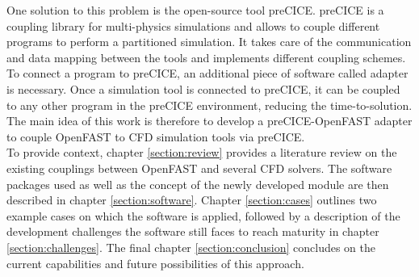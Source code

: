 One solution to this problem is the open-source tool preCICE. preCICE is a coupling library for multi-physics simulations and allows to couple different programs to perform a partitioned simulation. It takes care of the communication and data mapping between the tools and implements different coupling schemes. To connect a program to preCICE, an additional piece of software called adapter is necessary. Once a simulation tool is connected to preCICE, it can be coupled to any other program in the preCICE environment, reducing the time-to-solution. The main idea of this work is therefore to develop a preCICE-OpenFAST adapter to couple OpenFAST to CFD simulation tools via preCICE.\\

To provide context, chapter \ref{section:review} provides a literature review on the existing couplings between OpenFAST and several CFD solvers. The software packages used as well as the concept of the newly developed module are then described in chapter \ref{section:software}. Chapter \ref{section:cases} outlines two example cases on which the software is applied, followed by a description of the development challenges the software still faces to reach maturity in chapter \ref{section:challenges}. The final chapter \ref{section:conclusion} concludes on the current capabilities and future possibilities of this approach.

